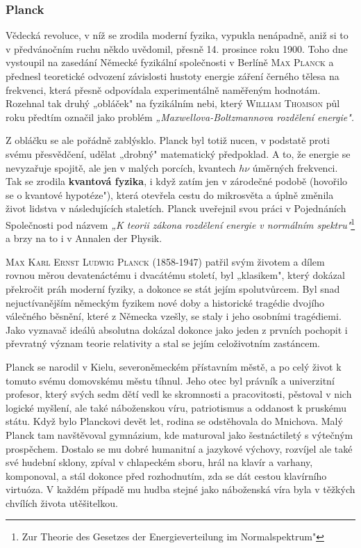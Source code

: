       \subsubsection{Planck}\label{fyz:IchapIIsecIVssecIsssecVI}
        Vědecká revoluce, v níž se zrodila moderní fyzika, vypukla nenápadně, aniž si to v
        předvánočním ruchu někdo uvědomil, přesně 14. prosince roku 1900. Toho dne vystoupil na
        zasedání Německé fyzikální společnosti v Berlíně \textsc{Max Planck} a přednesl teoretické
        odvození závislosti hustoty energie záření černého tělesa na frekvenci, která přesně
        odpovídala experimentálně naměřeným hodnotám. Rozehnal tak druhý „obláček" na fyzikálním
        nebi, který \textsc{William Thomson} půl roku předtím označil jako problém
        \emph{„Maxwellova-Boltzmannova rozdělení energie".}

        Z obláčku se ale pořádně zablýsklo. Planck byl totiž nucen, v podstatě proti svému
        přesvědčení, udělat „drobný" matematický předpoklad. A to, že energie se nevyzařuje spojitě,
        ale jen v malých porcích, kvantech \(h\nu\) úměrných frekvenci. Tak se zrodila
        \textbf{kvantová fyzika}, i když zatím jen v zárodečné podobě (hovořilo se o kvantové
        hypotéze"), která otevřela cestu do mikrosvěta a úplně změnila život lidstva v následujících
        staletích. Planck uveřejnil svou práci v Pojednáních Společnosti pod názvem \emph{„K teorii
        zákona rozdělení energie v normálním spektru"}\footnote{Zur Theorie des Gesetzes der
        Energieverteilung im Normalspektrum"} a brzy na to i v Annalen der Physik.

        \textsc{Max Karl Ernst Ludwig Planck} (1858-1947) patřil svým životem a dílem rovnou měrou
        devatenáctému i dvacátému století, byl „klasikem", který dokázal překročit práh moderní
        fyziky, a dokonce se stát jejím spolutvůrcem. Byl snad nejuctívanějším německým fyzikem nové
        doby a historické tragédie dvojího válečného běsnění, které z Německa vzešly, se staly i
        jeho osobními tragédiemi. Jako vyznavač ideálů absolutna dokázal dokonce jako jeden z
        prvních pochopit i převratný význam teorie relativity a stal se jejím celoživotním
        zastáncem.

        Planck se narodil v Kielu, severoněmeckém přístavním městě, a po celý život k tomuto svému
        domovskému městu tíhnul. Jeho otec byl právník a univerzitní profesor, který svých sedm dětí
        vedl ke skromnosti a pracovitosti, pěstoval v nich logické myšlení, ale také náboženskou
        víru, patriotismus a oddanost k pruskému státu. Když bylo Planckovi devět let, rodina se
        odstěhovala do Mnichova. Malý Planck tam navštěvoval gymnázium, kde maturoval jako
        šestnáctiletý s výtečným prospěchem. Dostalo se mu dobré humanitní a jazykové výchovy,
        rozvíjel ale také své hudební sklony, zpíval v chlapeckém sboru, hrál na klavír a varhany,
        komponoval, a stál dokonce před rozhodnutím, zda se dát cestou klavírního virtuóza. V každém
        případě mu hudba stejné jako náboženská víra byla v těžkých chvílích života utěšitelkou.

